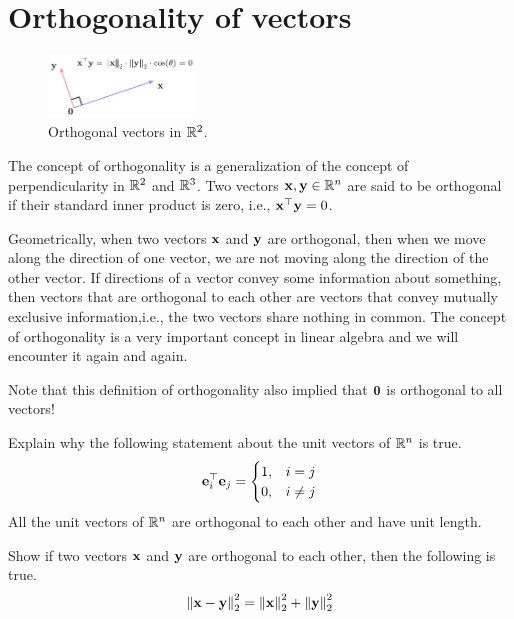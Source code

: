 \section{Orthogonality of vectors}

\begin{figure}
    \centering
    \includegraphics[width=0.35\textwidth]{figure/chapter01/ortho-demo.pdf}
    \caption{Orthogonal vectors in $\mathbb{R}^2$.}
    \label{fig:ch01-orthog-vectors}
\end{figure}
The concept of orthogonality is a generalization of the concept of perpendicularity in $\mathbb{R}^2$ and $\mathbb{R}^3$. Two vectors $\mathbf{x}, \mathbf{y} \in \mathbb{R}^n$ are said to be orthogonal if their standard inner product is zero, i.e., $\mathbf{x}^\top\mathbf{y} = 0$.

Geometrically, when two vectors $\mathbf{x}$ and $\mathbf{y}$ are orthogonal, then when we move along the direction of one vector, we are not moving along the direction of the other vector. If directions of a vector convey some information about something, then vectors that are orthogonal to each other are vectors that convey mutually exclusive information,i.e., the two vectors share nothing in common. The concept of orthogonality is a very important concept in linear algebra and we will encounter it again and again.

Note that this definition of orthogonality also implied that $\mathbf{0}$ is orthogonal to all vectors!

\begin{boxedstuff}
    \begin{problem}
        Explain why the following statement about the unit vectors of $\mathbb{R}^n$ is true.
        \[ \mathbf{e}_i^\top\mathbf{e}_j = \begin{cases} 1, & i = j \\ 0, & i \neq j \end{cases} \]
        All the unit vectors of $\mathbb{R}^n$ are orthogonal to each other and have unit length.
    \end{problem}
    \begin{problem}
        Show if two vectors $\mathbf{x}$ and $\mathbf{y}$ are orthogonal to each other, then the following is true.
        \[ \left\lVert \mathbf{x} - \mathbf{y} \right\rVert_2^2 = \left\lVert \mathbf{x} \right\rVert_2^2 + \left\lVert \mathbf{y} \right\rVert_2^2 \]
    \end{problem}
\end{boxedstuff}

